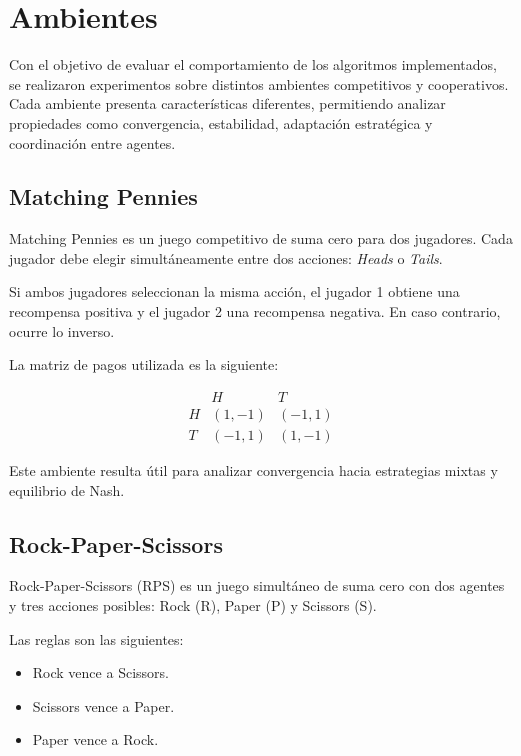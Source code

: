 \documentclass[letterpaper,12pt]{article} %
\begin{document}
\clearpage
\section{Ambientes}

Con el objetivo de evaluar el comportamiento de los algoritmos implementados, se realizaron experimentos sobre distintos ambientes competitivos y cooperativos. Cada ambiente presenta características diferentes, permitiendo analizar propiedades como convergencia, estabilidad, adaptación estratégica y coordinación entre agentes.

\subsection{Matching Pennies}

Matching Pennies es un juego competitivo de suma cero para dos jugadores. Cada jugador debe elegir simultáneamente entre dos acciones: \textit{Heads} o \textit{Tails}.

Si ambos jugadores seleccionan la misma acción, el jugador 1 obtiene una recompensa positiva y el jugador 2 una recompensa negativa. En caso contrario, ocurre lo inverso.

La matriz de pagos utilizada es la siguiente:

\[
\begin{array}{c|cc}
 & H & T \\
\hline
H & (1,-1) & (-1,1) \\
T & (-1,1) & (1,-1)
\end{array}
\]

Este ambiente resulta útil para analizar convergencia hacia estrategias mixtas y equilibrio de Nash.


\subsection{Rock-Paper-Scissors}

Rock-Paper-Scissors (RPS) es un juego simultáneo de suma cero con dos agentes y tres acciones posibles: Rock (R), Paper (P) y Scissors (S).

Las reglas son las siguientes:

\begin{itemize}
    \item Rock vence a Scissors.
    \item Scissors vence a Paper.
    \item Paper vence a Rock.
\end{itemize}
\end{document}
